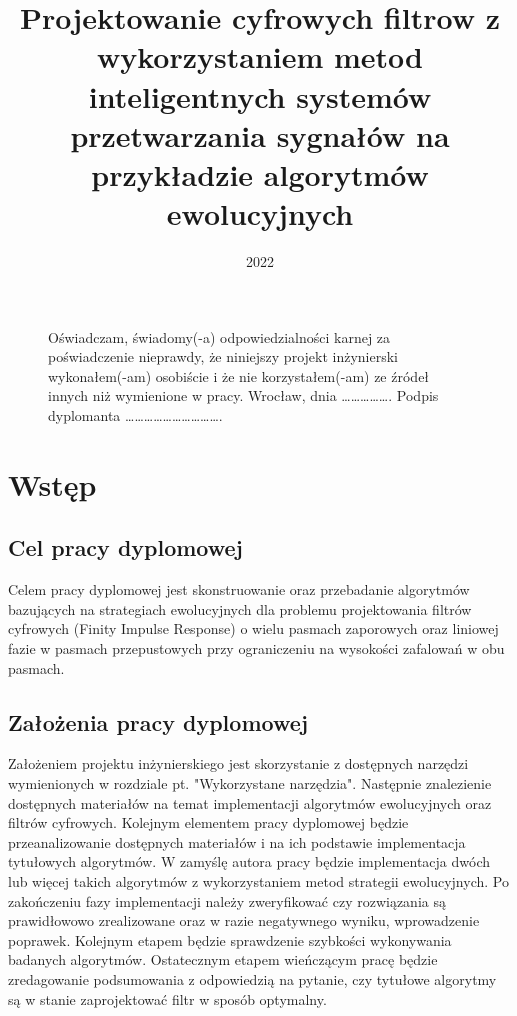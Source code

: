 \documentclass[eng, pl, oneside, openright, final, openbib]{mgr}\DeclareUnicodeCharacter{0301}{\'{e}}
\author{}
\title{Projektowanie cyfrowych filtrow z wykorzystaniem metod inteligentnych systemów przetwarzania sygnałów na przykładzie algorytmów ewolucyjnych}
\date{2022}
\begin{document}
\maketitle


\begin{figure}[b]
Oświadczam, świadomy(-a) odpowiedzialności karnej za poświadczenie
nieprawdy, że niniejszy projekt inżynierski wykonałem(-am) osobiście i że nie
korzystałem(-am) ze źródeł innych niż wymienione w pracy.
\newline
Wrocław, dnia ……………. Podpis dyplomanta ………………………….
\end{figure}

\tableofcontents


\chapter{Wstęp}
\section{Cel pracy dyplomowej}
Celem pracy dyplomowej jest skonstruowanie oraz przebadanie algorytmów bazujących na strategiach ewolucyjnych dla problemu projektowania filtrów cyfrowych (Finity Impulse Response) o wielu pasmach zaporowych oraz liniowej fazie w pasmach przepustowych przy ograniczeniu na wysokości zafalowań w obu pasmach.  
  
\section{Założenia pracy dyplomowej}
Założeniem projektu inżynierskiego jest skorzystanie z dostępnych narzędzi wymienionych w rozdziale pt. "Wykorzystane narzędzia". Następnie znalezienie dostępnych materiałów na temat implementacji algorytmów ewolucyjnych oraz filtrów cyfrowych. Kolejnym elementem pracy dyplomowej będzie przeanalizowanie dostępnych materiałów i na ich podstawie implementacja tytułowych algorytmów. W zamyślę autora pracy będzie implementacja dwóch lub więcej takich algorytmów z wykorzystaniem metod  strategii ewolucyjnych. Po zakończeniu fazy implementacji należy zweryfikować czy rozwiązania są prawidłowowo zrealizowane oraz w razie negatywnego wyniku, wprowadzenie poprawek. Kolejnym etapem będzie sprawdzenie szybkości wykonywania badanych algorytmów. Ostatecznym etapem wieńczącym pracę będzie zredagowanie podsumowania z odpowiedzią na pytanie, czy tytułowe algorytmy są w stanie zaprojektować filtr w sposób optymalny.
 
\end{document}
